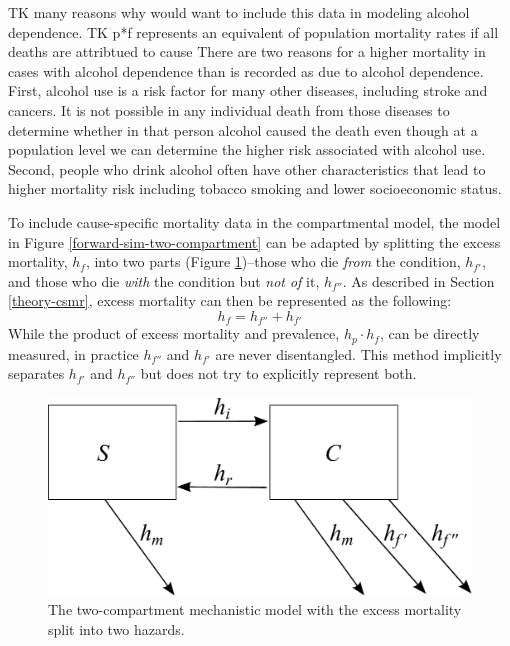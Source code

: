 TK many reasons why would want to include this data in modeling alcohol dependence.
TK p*f represents an equivalent of population mortality rates if all deaths are attribtued to cause
There are two reasons for a higher mortality in cases with alcohol 
dependence than is recorded as due to alcohol dependence. First, 
alcohol use is a risk factor for many other diseases, including 
stroke and cancers. It is not possible in any individual death 
from those diseases to determine whether in that person alcohol 
caused the death even though at a population level we can determine 
the higher risk associated with alcohol use. Second, people who 
drink alcohol often have other characteristics that lead to higher 
mortality risk including tobacco smoking and lower socioeconomic status.

To include cause-specific mortality data in the compartmental model,
the model in Figure \ref{forward-sim-two-compartment} can be adapted
by splitting the excess mortality, $h_{f}$, into two parts (Figure
\ref{fig:two_compartment_2f})--those who die \emph{from} the
condition, $h_{f'}$, and those who die \emph{with} the condition but
\emph{not of} it, $h_{f''}$.  As described in Section
\ref{theory-csmr}, excess mortality can then be represented as the
following:
    \begin{equation}
        h_{f} = h_{f''} + h_{f'}
    \end{equation}
While the product of excess mortality and prevalence, $h_{p} \cdot h_{f}$,
can be directly measured, in practice $h_{f''}$ and $h_{f'}$ are never
disentangled.  This method implicitly separates $h_{f'}$ and $h_{f''}$
but does not try to explicitly represent both.

    \begin{figure}[h]
        \begin{center}
            \includegraphics[width=\textwidth]{SC2.pdf}
            \caption{The two-compartment mechanistic model with the
              excess mortality split into two hazards.}
            \label{fig:two_compartment_2f}
        \end{center}
    \end{figure}

